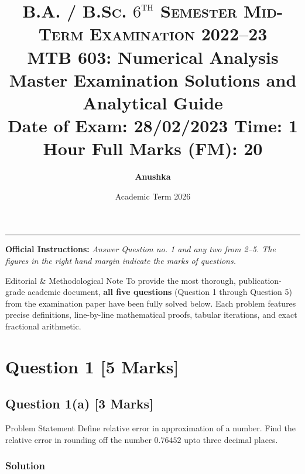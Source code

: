 \documentclass[11pt,a4paper]{article}
\title{
    \vspace{-1.2cm}
    {\large\scshape B.A. / B.Sc. $6^{\text{th}}$ Semester Mid-Term Examination 2022--23}\\[0.3cm]
    {\huge\textbf{\color{navyblue}MTB 603: Numerical Analysis}}\\[0.25cm]
    {\large\bfseries Master Examination Solutions and Analytical Guide}\\[0.2cm]
    {\small\color{darkgray}\textbf{Date of Exam:} 28/02/2023 \qquad \textbf{Time:} 1 Hour \qquad \textbf{Full Marks (FM):} 20}
}
\author{\textbf{\Large Anushka}}
\date{\small Academic Term 2026}
\begin{document}
\maketitle
\thispagestyle{empty}

\noindent\rule{\textwidth}{1pt}

\begin{center}
\small
\textbf{Official Instructions:} \textit{Answer Question no. 1 and any two from 2--5. The figures in the right hand margin indicate the marks of questions.}
\end{center}

\begin{notebox}{Editorial \& Methodological Note}
To provide the most thorough, publication-grade academic document, \textbf{all five questions} (Question 1 through Question 5) from the examination paper have been fully solved below. Each problem features precise definitions, line-by-line mathematical proofs, tabular iterations, and exact fractional arithmetic.
\end{notebox}

\vspace{0.3cm}

\section*{Question 1 \hfill \normalsize [5 Marks]}

\subsection*{Question 1(a) \hfill [3 Marks]}

\begin{questionbox}{Problem Statement}
Define relative error in approximation of a number. Find the relative error in rounding off the number $0.76452$ upto three decimal places.
\end{questionbox}

\subsubsection*{Solution}
\end{document}
